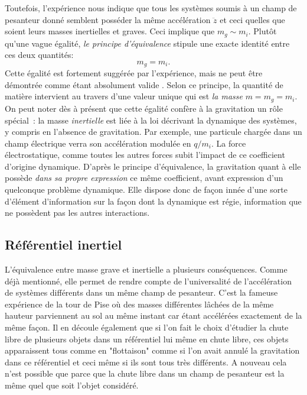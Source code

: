 Toutefois, l'expérience nous indique que tous les systèmes soumis à un champ de pesanteur donné semblent posséder la même accélération $\ddot z$ et ceci quelles que soient leurs masses inertielles et graves. Ceci implique que $m_g\sim m_i$. Plutôt qu'une vague égalité, \textit{le principe d'équivalence} stipule une exacte identité entre ces deux quantités:
\begin{equation}
m_g=m_i.
\end{equation}
Cette égalité est fortement suggérée par l'expérience, mais ne peut être démontrée comme étant absolument valide . Selon ce principe, la quantité de matière intervient au travers d'une valeur unique qui est \textit{la masse} $m=m_g=m_i$. On peut noter dès à présent que cette égalité confère à la gravitation un rôle spécial~: la masse \textit{inertielle} est liée à la loi décrivant la dynamique des systèmes, y compris en l'absence de gravitation. Par exemple, une particule chargée dans un champ électrique verra son accélération modulée en $q/m_i$. La force électrostatique, comme toutes les autres forces subit l'impact de ce coefficient d'origine dynamique. D'après le principe d'équivalence, la gravitation quant à elle possède \textit{dans sa propre expression} ce même coefficient, avant expression d'un quelconque problème dynamique. Elle dispose donc de façon innée d'une sorte d'élément d'information sur la façon dont la dynamique est régie, information que ne possèdent pas les autres interactions.

\subsection{Référentiel inertiel}
L'équivalence entre masse grave et inertielle a plusieurs conséquences. Comme déjà mentionné, elle permet de rendre compte de l'universalité de l'accélération de systèmes différents dans un même champ de pesanteur. C'est la fameuse expérience de la tour de Pise où des masses différentes lâchées de la même hauteur parviennent au sol au même instant car étant accélérées exactement de la même façon. Il en découle également que si l'on fait le choix d'étudier la chute libre de plusieurs objets dans un référentiel lui même en chute libre, ces objets apparaissent tous comme en "flottaison" comme si l'on avait annulé la gravitation dans ce référentiel et ceci même si ils sont tous très différents. A nouveau cela n'est possible que parce que la chute libre dans un champ de pesanteur est la même quel que soit l'objet considéré. 

